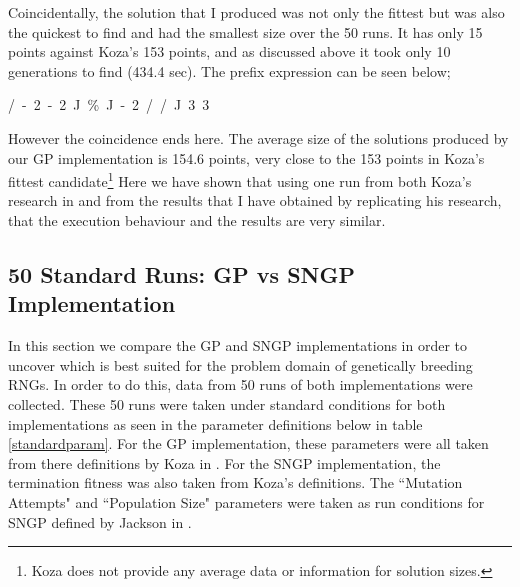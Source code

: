 \documentclass[a4paper,10.5pt]{article}
\begin{document}
Coincidentally, the solution that I produced was not only the fittest but was also the quickest to find and had the smallest size over the 50 runs. It has only 15 points against Koza's 153 points, and as discussed above it took only 10 generations to find (434.4 sec). The prefix expression can be seen below;
\begin{center}
/\ -\ 2\ -\ 2\ J\ \%\ J\ -\ 2\ /\ /\ J\ 3\ 3
\end{center}
However the coincidence ends here. The average size of the solutions produced by our GP implementation is 154.6 points, very close to the 153 points in Koza's fittest candidate\footnote{Koza does not provide any average data or information for solution sizes.}
Here we have shown that using one run from both Koza's research in \cite{kozarng} and from the results that I have obtained by replicating his research, that the execution behaviour and the results are very similar.


\subsection{50 Standard Runs: GP vs SNGP Implementation}
\label{gpvssngp}

In this section we compare the GP and SNGP implementations in order to uncover which is best suited for the problem domain of genetically breeding RNGs. In order to do this, data from 50 runs of both implementations were collected. These 50 runs were taken under standard conditions for both implementations as seen in the parameter definitions below in table \ref{standardparam}. For the GP implementation, these parameters were all taken from there definitions by Koza in \cite[p.6]{kozarng}. For the SNGP implementation, the termination fitness was also taken from Koza's definitions. The ``Mutation Attempts" and ``Population Size" parameters were taken as run conditions for SNGP defined by Jackson in \cite[p.54]{jacksonsngp}. %
\end{document}

